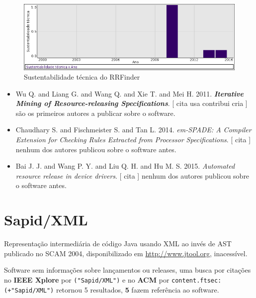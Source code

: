 \begin{figure}[h]
  \center
  \includegraphics[scale=0.50]{result-documents/charts/rrfinder.png}
  \caption{Sustentabilidade técnica do RRFinder}
\end{figure}


\begin{itemize}
\item Wu Q. and Liang G. and Wang Q. and Xie T. and Mei H.
      2011.
        \textbf{\textit{ Iterative Mining of Resource-releasing Specifications}}.
      [
          cita
          usa
          contribui
          cria
      ]
são os primeiros autores a publicar sobre o software.
\item Chaudhary S. and Fischmeister S. and Tan L.
      2014.
        \textit{ em-SPADE: A Compiler Extension for Checking Rules Extracted from Processor Specifications}.
      [
          cita
      ]
nenhum dos autores publicou sobre o software antes.
\item Bai J. J. and Wang P. Y. and Liu Q. H. and Hu M. S.
      2015.
        \textit{ Automated resource release in device drivers}.
      [
          cita
      ]
nenhum dos autores publicou sobre o software antes.
\end{itemize}
\section{Sapid/XML}

Representação intermediária de código Java usando XML ao invés de AST
publicado no SCAM 2004,
disponibilizado em \url{http://www.jtool.org},
inacessível.

Software sem informações sobre lançamentos ou releases,
uma busca por citações no {\bf IEEE Xplore} por
\texttt{("Sapid/XML")}
e no {\bf ACM} por
\texttt{content.ftsec:(+"Sapid/XML")}
retornou
5 resultados,
{\bf 5} fazem referência ao software.


